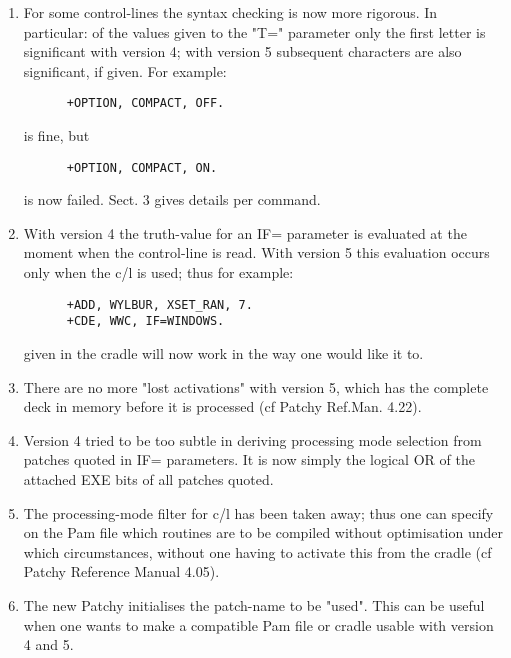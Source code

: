 \begin{enumerate}
\item
For some control-lines the syntax checking is now more rigorous.
In particular: of the values given to the "T=" parameter only the first
letter is significant with version 4; with version 5 subsequent characters
are also significant, if given. For example:
\begin{verbatim}
      +OPTION, COMPACT, OFF.
\end{verbatim}
is fine, but
\begin{verbatim}
      +OPTION, COMPACT, ON.
\end{verbatim}
is now failed. Sect. 3 gives details per command.

\item
With version 4 the truth-value for an IF= parameter is evaluated at
the moment when the control-line is read. With version 5 this evaluation
occurs only when the c/l is used; thus for example:
\begin{verbatim}
      +ADD, WYLBUR, XSET_RAN, 7.
      +CDE, WWC, IF=WINDOWS.
\end{verbatim}

given in the cradle will now work in the way one would like it to.

\item
There are no more "lost activations" with version 5, which has the
complete deck in memory before it is processed (cf Patchy Ref.Man. 4.22).

\item
Version 4 tried to be too subtle in deriving processing mode
selection from patches quoted in IF= parameters. It is now simply
the logical OR of the attached EXE bits of all patches quoted.

\item
The processing-mode filter for c/l  has been taken away;
thus one can specify on the Pam file which routines are to be compiled
without optimisation under which circumstances, without one having
to activate this from the cradle (cf Patchy Reference Manual 4.05).

\item
The new Patchy initialises the patch-name  to be "used".
This can be useful when one wants to make a compatible Pam file or
cradle usable with version 4 and 5.


\end{enumerate}
